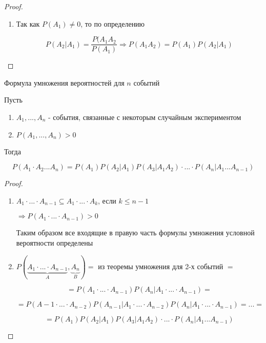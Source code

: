 \documentclass[a4paper, 14pt]{report}
\begin{document}
\begin{proof}
    \begin{enumerate}
        \item Так как $P(A_1) \ne 0$, то по определению

            $$
            P(A_2|A_1) = \frac{P(A_1A_2}{P(A_1)} \Rightarrow P(A_1A_2) = P(A_1)P(A_2|A_1)
            $$
    \end{enumerate}    
\end{proof}

\begin{theorem}
    Формула умножения вероятностей для $n$ событий

    Пусть

    \begin{enumerate}
        \item $A_1,...,A_n$ - события, связанные с некоторым случайным экспериментом
        \item $P(A_1,...,A_n) > 0$
    \end{enumerate}

    Тогда

    $$
    P(A_1 \cdot A_2 ... A_n) = P(A_1)P(A_2|A_1)P(A_3|A_1A_2) \cdot ... \cdot P(A_n|A_1...A_{n-1})
    $$
\end{theorem}

\begin{proof}
    \begin{enumerate}
        \item $A_1 \cdot ... \cdot A_{n-1} \subseteq A_1 \cdot ... \cdot A_k$, если $k \le n-1$

            $\Rightarrow P(A_1 \cdot ... \cdot A_{n-1}) > 0$

            Таким образом все входящие в правую часть формулы умножения условной вероятности определены

        \item $P(\underbrace{A_1 \cdot ... \cdot A_{n-1}}_A, \underbrace{A_n}_B) = $ из теоремы умножения для 2-х событий $=$

            $$
            = P(A_1 \cdot ... \cdot A_{n-1})P(A_n|A_1 \cdot ... \cdot A_{n-1}) =
            $$

            $$
            = P(A-1 \cdot ... \cdot A_{n-2})P(A_{n-1}|A_1 \cdot ... \cdot A_{n-2})P(A_n | A_1 \cdot ... \cdot A_{n-1}) = ... =
            $$

            $$
            = P(A_1)P(A_2|A_1)P(A_3|A_1A_2) \cdot ... \cdot P(A_n|A_1...A_{n-1})
            $$
    \end{enumerate}
\end{proof}
\end{document}
